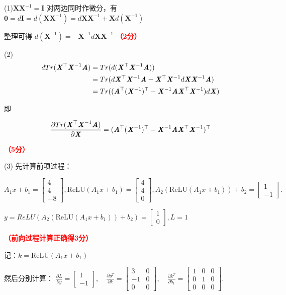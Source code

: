\documentclass[12pt,a4paper,openany,twoside]{ctexbook}
\begin{document}
\begin{Solution}
	(1)$\mathbf{X}\mathbf{X}^{-1}=\mathbf{I}$ 对两边同时作微分，有 $\mathbf{0}=d\mathbf{I}=d(\mathbf{X}\mathbf{X}^{-1})=d\mathbf{X} \mathbf{X}^{-1}+\mathbf{X}d(\mathbf{X}^{-1})$

整理可得 $d(\mathbf{X}^{-1})=-\mathbf{X}^{-1}d\mathbf{X} \mathbf{X}^{-1}$
\hfill \textcolor{red}{\textbf{（2分）}}

(2) 
$$
	\begin{aligned}
		dTr(\boldsymbol{\mathit{X}}^\top \boldsymbol{\mathit{X}}^{-1} \boldsymbol{\mathit{A}}) &= Tr(d(\boldsymbol{\mathit{X}}^\top \boldsymbol{\mathit{X}}^{-1} \boldsymbol{\mathit{A}}))\\
		&= Tr( d\boldsymbol{\mathit{X}}^\top \boldsymbol{\mathit{X}}^{-1}\boldsymbol{\mathit{A}} -\boldsymbol{\mathit{X}}^\top \boldsymbol{\mathit{X}}^{-1} d\boldsymbol{\mathit{X}} \boldsymbol{\mathit{X}}^{-1} \boldsymbol{\mathit{A}})\\
		&= Tr((\boldsymbol{\mathit{A}}^\top (\boldsymbol{\mathit{X}}^{-1})^\top -\boldsymbol{\mathit{X}}^{-1}\boldsymbol{\mathit{A}}\boldsymbol{\mathit{X}}^\top \boldsymbol{\mathit{X}}^{-1}) d\boldsymbol{\mathit{X}})
	\end{aligned}
	$$
	
	即
	
	$$
	\begin{aligned}
		\frac{\partial Tr(\boldsymbol{\mathit{X}}^\top \boldsymbol{\mathit{X}}^{-1} \boldsymbol{\mathit{A}})}{\partial \boldsymbol{\mathit{X}}} = (\boldsymbol{\mathit{A}}^\top (\boldsymbol{\mathit{X}}^{-1})^\top -\boldsymbol{\mathit{X}}^{-1}\boldsymbol{\mathit{A}}\boldsymbol{\mathit{X}}^\top \boldsymbol{\mathit{X}}^{-1})^\top
	\end{aligned}
	$$

	\hfill \textcolor{red}{\textbf{（5分）}}


(3) 先计算前项过程：

$A_1 x + b_1 
=
\begin{bmatrix}
4 \\
4 \\
-8
\end{bmatrix},
\text{ReLU}(A_1 x + b_1)=
\begin{bmatrix}
4 \\
4 \\
0
\end{bmatrix}
,
A_2 (\text{ReLU}(A_1 x + b_1)) + b_2 =
\begin{bmatrix}
1 \\
-1
\end{bmatrix}.$

$y=ReLU(A_2 (\text{ReLU}(A_1 x + b_1)) + b_2)=\begin{bmatrix}
	1 \\
	0
	\end{bmatrix},L = 1$

	\hfill \textcolor{red}{\textbf{（前向过程计算正确得3分）}}

	记：${k} = \text{ReLU}(A_1 x + b_1)$

	然后分别计算：
	$\frac{\partial L}{\partial {y}} =
	\begin{bmatrix}
	1 \\
	-1
	\end{bmatrix},
	\quad
	\frac{\partial {y}^T}{\partial {k}} =
	\begin{bmatrix}
	3 & 0 \\
	-1 & 0 \\
	0 & 0
	\end{bmatrix},
	\quad
	\frac{\partial {k}^T}{\partial b_1} =
	\begin{bmatrix}
	1 & 0 & 0 \\
	0 & 1 & 0 \\
	0 & 0 & 0
	\end{bmatrix}.$
	

\end{Solution}
\end{document}
